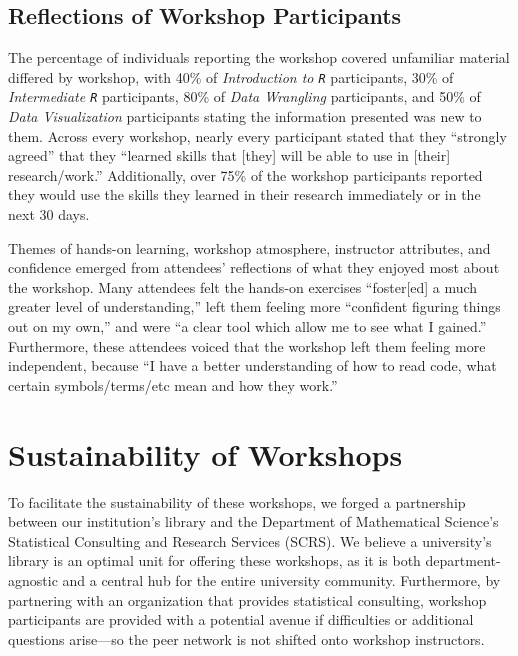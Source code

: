 \documentclass[12pt]{article}
\begin{document}
\subsection{Reflections of Workshop Participants} 

\noindent The percentage of individuals reporting the workshop covered 
unfamiliar material differed by workshop, with 40\% of \emph{Introduction
to \texttt{R}} participants, 30\% of \emph{Intermediate \texttt{R}}
participants, 80\% of \emph{Data Wrangling} participants, and 50\% of 
\emph{Data Visualization} participants stating the information presented was
new to them. Across every workshop, nearly every participant stated that they
``strongly agreed'' that they ``learned skills that [they] will be able to use
in [their] research/work.'' Additionally, over 75\% of the workshop participants
reported they would use the skills they learned in their research immediately or
in the next 30 days. 

\quad Themes of hands-on learning, workshop atmosphere, instructor attributes,
and confidence emerged from attendees' reflections of what they enjoyed most
about the workshop. Many attendees felt the hands-on exercises ``foster[ed] a
much greater level of understanding,'' left them feeling more ``confident
figuring things out on my own,'' and were ``a clear tool which allow me to see
what I gained.'' Furthermore, these attendees voiced that the workshop left them
feeling more independent, because ``I have a better understanding of how to read
code, what certain symbols/terms/etc mean and how they work.'' 

\section{Sustainability of Workshops}  
\label{sec:sustainability}

\noindent To facilitate the sustainability of these workshops, we forged a
partnership between our institution's library and the Department of Mathematical
Science's Statistical Consulting and Research Services (SCRS). We believe a 
university's library is an optimal unit for offering these workshops, as it is
both department-agnostic and a central hub for the entire university community.
Furthermore, by partnering with an organization that provides statistical
consulting, workshop participants are provided with a potential avenue if
difficulties or additional questions arise---so the peer network is not shifted 
onto workshop instructors. 
\end{document}
